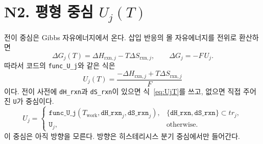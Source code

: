 \documentclass[11pt,a4paper]{article}
\newcommand{\work}{\mathrm{work}}
\begin{document}
\section{N2. 평형 중심 $U_j(T)$}\label{sec:N2}
전이 중심은 Gibbs 자유에너지에서 온다. 삽입 반응의 몰 자유에너지를 전위로 환산하면
\begin{equation}
\Delta G_j(T)=\Delta H_{\mathrm{rxn},j}-T\Delta S_{\mathrm{rxn},j},
\qquad
\Delta G_j=-F\,U_j.
\label{eq:gibbsU}
\end{equation}
따라서 코드의 \texttt{func\_U\_j}와 같은 식은
\begin{equation}
\boxed{\;U_j(T)=\frac{-\Delta H_{\mathrm{rxn},j}+T\Delta S_{\mathrm{rxn},j}}{F}\;}
\label{eq:UjT}
\end{equation}
이다. 전이 사전에 \texttt{dH\_rxn}과 \texttt{dS\_rxn}이 있으면 식~\eqref{eq:UjT}를 쓰고, 없으면 직접 주어진 \texttt{U}가 중심이다.
\begin{equation}
U_j=
\begin{cases}
\texttt{func\_U\_j}(T_{\work},\texttt{dH\_rxn}_j,\texttt{dS\_rxn}_j),&
\{\texttt{dH\_rxn},\texttt{dS\_rxn}\}\subset tr_j,\\
\texttt{U}_j,&\text{otherwise}.
\end{cases}
\label{eq:Udispatch}
\end{equation}
이 중심은 아직 방향을 모른다. 방향은 히스테리시스 분기 중심에서만 들어간다.

\end{document}
